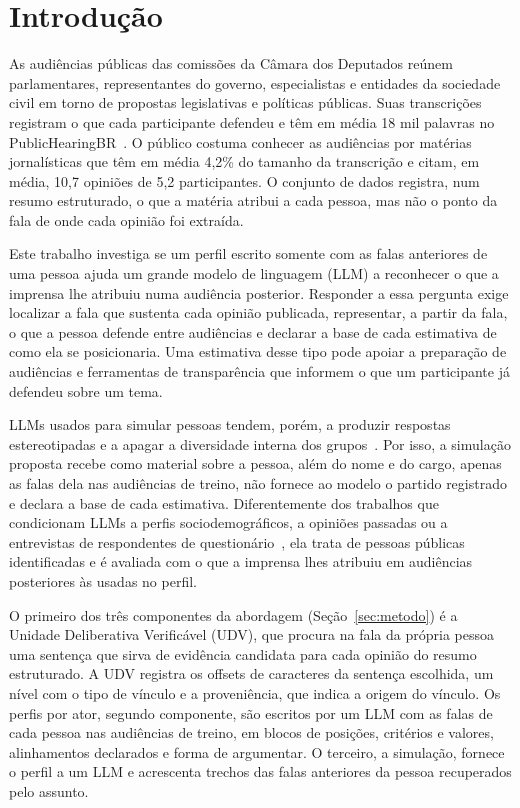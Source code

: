 \section{Introdu\c{c}\~ao}
\label{sec:introducao}

As audiências públicas das comissões da Câmara dos Deputados reúnem parlamentares, representantes
do governo, especialistas e entidades da sociedade civil em torno de propostas legislativas e
políticas públicas. Suas transcrições registram o que cada participante defendeu e têm em média 18
mil palavras no PublicHearingBR~\citep{fernandes2024publichearingbr}. O público costuma conhecer as
audiências por matérias jornalísticas que têm em média 4,2\% do tamanho da transcrição e citam, em
média, 10,7 opiniões de 5,2 participantes. O conjunto de dados registra, num resumo estruturado, o
que a matéria atribui a cada pessoa, mas não o ponto da fala de onde cada opinião foi extraída.

Este trabalho investiga se um perfil escrito somente com as falas anteriores de uma pessoa ajuda um
grande modelo de linguagem (LLM) a reconhecer o que a imprensa lhe atribuiu numa audiência
posterior. Responder a essa pergunta exige localizar a fala que sustenta cada opinião publicada,
representar, a partir da fala, o que a pessoa defende entre audiências e declarar a base de cada
estimativa de como ela se posicionaria. Uma estimativa desse tipo pode apoiar a preparação de
audiências e ferramentas de transparência que informem o que um participante já defendeu sobre um
tema.

LLMs usados para simular pessoas tendem, porém, a produzir respostas estereotipadas e a apagar a
diversidade interna dos grupos~\citep{bisbee2024synthetic,wang2025large}. Por isso, a simulação
proposta recebe como material sobre a pessoa, além do nome e do cargo, apenas as falas dela nas
audiências de treino, não fornece ao modelo o partido registrado e declara a base de cada estimativa.
Diferentemente dos trabalhos que condicionam LLMs a perfis sociodemográficos, a opiniões passadas ou
a entrevistas de respondentes de questionário~\citep{argyle2023outofone,hwang2023aligning,park2026llm},
ela trata de pessoas públicas identificadas e é avaliada com o que a imprensa lhes atribuiu em
audiências posteriores às usadas no perfil.

O primeiro dos três componentes da abordagem (Seção~\ref{sec:metodo}) é a Unidade Deliberativa
Verificável (UDV), que procura na fala da própria pessoa uma sentença que sirva de evidência
candidata para cada opinião do resumo estruturado. A UDV registra os offsets de caracteres da
sentença escolhida, um nível com o tipo de vínculo e a proveniência, que indica a origem do vínculo.
Os perfis por ator, segundo componente, são escritos por um LLM com as falas de cada pessoa nas
audiências de treino, em blocos de posições, critérios e valores, alinhamentos declarados e forma de
argumentar. O terceiro, a simulação, fornece o perfil a um LLM e acrescenta trechos das falas
anteriores da pessoa recuperados pelo assunto.

